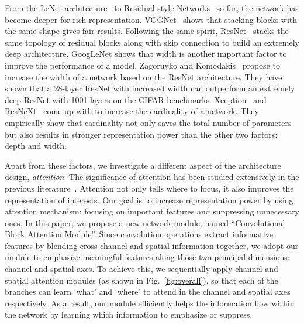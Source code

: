 \documentclass[runningheads]{llncs}
\newcommand{\figref}[1]{Fig.~\ref{#1}}
\newcommand*{\modulenamefull}{Convolutional Block Attention Module}
\begin{document}
From the LeNet architecture~\cite{lecun1998gradient} to Residual-style Networks~\cite{he2016deep,zagoruyko2016wide,xie2016aggregated,szegedy2017v4} so far, the network has become deeper for rich representation. VGGNet~\cite{simonyan2014very} shows that stacking blocks with the same shape gives fair results. Following the same spirit, ResNet~\cite{he2016deep} stacks the same topology of residual blocks along with skip connection to build an extremely deep architecture. %
GoogLeNet \cite{szegedy2015going} shows that width is another important factor to improve the performance of a model. Zagoruyko and Komodakis~\cite{zagoruyko2016wide} propose to increase the width of a network based on the ResNet architecture. They have shown that a 28-layer ResNet with increased width can outperform an extremely deep ResNet with 1001 layers on the CIFAR benchmarks. Xception~\cite{chollet2016xception} and ResNeXt~\cite{xie2016aggregated} come up with to increase the cardinality of a network. They empirically show that cardinality not only saves the total number of parameters but also results in stronger representation power than the other two factors: depth and width.

Apart from these factors, we investigate a different aspect of the architecture design, \textit{attention}. The significance of attention has been studied extensively in the previous literature~\cite{mnih2014recurrent,ba2014multiple,Bahdanau2014,xu2015show,gregor2015draw,Jaderberg2015}. 
Attention not only tells where to focus, it also improves the representation of interests.
Our goal is to increase representation power by using attention mechanism: focusing on important features and suppressing unnecessary ones. In this paper, we propose a new network module, named ``\modulenamefull''. Since convolution operations extract informative features by blending cross-channel and spatial information together, we adopt our module to emphasize meaningful features along those two principal dimensions: channel and spatial axes. To achieve this, we sequentially apply channel and spatial attention modules (as shown in \figref{fig:overall}), so that each of the branches can learn `what' and `where' to attend in the channel and spatial axes respectively. As a result, our module efficiently helps the information flow within the network by learning which information to emphasize or suppress.
\end{document}

